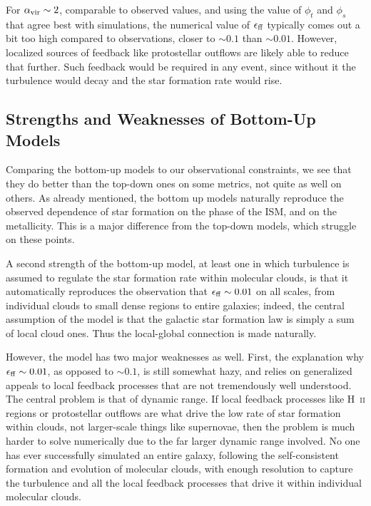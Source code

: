 For $\alpha_{\rm vir} \sim 2$, comparable to observed values, and using the value of $\phi_t$ and $\phi_s$ that agree best with simulations, the numerical value of $\epsilon_{\rm ff}$ typically comes out a bit too high compared to observations, closer to $\sim 0.1$ than $\sim 0.01$. However, localized sources of feedback like protostellar outflows are likely able to reduce that further. Such feedback would be required in any event, since without it the turbulence would decay and the star formation rate would rise.

\subsection{Strengths and Weaknesses of Bottom-Up Models}

Comparing the bottom-up models to our observational constraints, we see that they do better than the top-down ones on some metrics, not quite as well on others. As already mentioned, the bottom up models naturally reproduce the observed dependence of star formation on the phase of the ISM, and on the metallicity. This is a major difference from the top-down models, which struggle on these points.

A second strength of the bottom-up model, at least one in which turbulence is assumed to regulate the star formation rate within molecular clouds, is that it automatically reproduces the observation that $\epsilon_{\rm ff} \sim 0.01$ on all scales, from individual clouds to small dense regions to entire galaxies; indeed, the central assumption of the model is that the galactic star formation law is simply a sum of local cloud ones. Thus the local-global connection is made naturally.

However, the model has two major weaknesses as well. First, the explanation why $\epsilon_{\rm ff} \sim 0.01$, as opposed to $\sim 0.1$, is still somewhat hazy, and relies on generalized appeals to local feedback processes that are not tremendously well understood. The central problem is that of dynamic range. If local feedback processes like H~\textsc{ii} regions or protostellar outflows are what drive the low rate of star formation within clouds, not larger-scale things like supernovae, then the problem is much harder to solve numerically due to the far larger dynamic range involved. No one has ever successfully simulated an entire galaxy, following the self-consistent formation and evolution of molecular clouds, with enough resolution to capture the turbulence and all the local feedback processes that drive it within individual molecular clouds.

